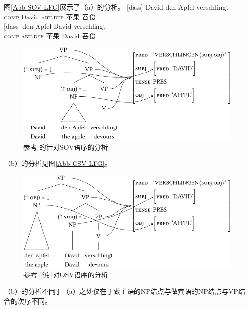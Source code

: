 图\vref{Abb-SOV-LFG}展示了（a）的分析。 
\eal
\ex 
\gll {}[dass] David den Apfel verschlingt\\
      \spacebr{}\textsc{comp} David \textsc{art}.\textsc{def} 苹果 吞食\\
\ex 
\gll {}[dass] den Apfel David verschlingt\\
     \spacebr{}\textsc{comp} \textsc{art}.\textsc{def} 苹果 David 吞食 \\
\zl
\begin{figure}
\centerline{%
\includegraphics{Figures/david-den-apfel-verschlingt-lfg-lsp-crop}
}
\caption{\label{Abb-SOV-LFG}参考 \citet{Berman96a-u}的针对SOV语序的分析}
\end{figure}%
（b）的分析见图\vref{Abb-OSV-LFG}。
\begin{figure}
\centerline{%
\includegraphics{Figures/den-apfel-david-verschlingt-lfg-lsp-crop}
}
\caption{\label{Abb-OSV-LFG}参考 \citet{Berman96a-u}的针对OSV语序的分析}
\end{figure}%
（b）的分析不同于（a）之处仅在于做主语的NP结点与做宾语的NP结点与VP结合的次序不同。

